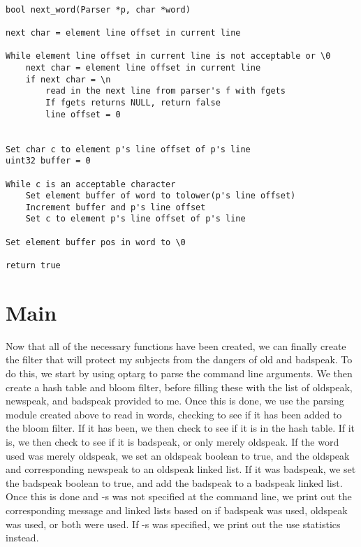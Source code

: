\documentclass[11pt]{article}
\begin{document}
\begin{verbatim}

bool next_word(Parser *p, char *word)

next char = element line offset in current line

While element line offset in current line is not acceptable or \0
    next char = element line offset in current line
    if next char = \n
        read in the next line from parser's f with fgets
        If fgets returns NULL, return false
        line offset = 0


Set char c to element p's line offset of p's line
uint32 buffer = 0

While c is an acceptable character
    Set element buffer of word to tolower(p's line offset)
    Increment buffer and p's line offset
    Set c to element p's line offset of p's line

Set element buffer pos in word to \0

return true

\end{verbatim}

\section{Main}

Now that all of the necessary functions have been created, we can finally create the filter that will protect my subjects from the dangers of old and badspeak. To do this, we start by using optarg to parse the command line arguments. We then create a hash table and bloom filter, before filling these with the list of oldspeak, newspeak, and badspeak provided to me. Once this is done, we use the parsing module created above to read in words, checking to see if it has been added to the bloom filter. If it has been, we then check to see if it is in the hash table. If it is, we then check to see if it is badspeak, or only merely oldspeak. If the word used was merely oldspeak, we set an oldspeak boolean to true, and the oldspeak and corresponding newspeak to an oldspeak linked list. If it was badspeak, we set the badspeak boolean to true, and add the badspeak to a badspeak linked list. Once this is done and -s was not specified at the command line, we print out
the corresponding message and linked lists based on if badspeak was used, oldspeak was used, or both were used. If -s was specified, we print out the use statistics instead.
\end{document}
